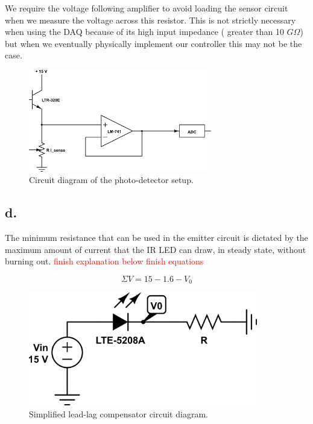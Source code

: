 \documentclass{article}
\newcommand{\xxx}[1]{\textcolor{red}{#1}}
\theoremstyle{plain}
\theoremstyle{definition}
\theoremstyle{remark}
\begin{document}
We require the voltage following amplifier to avoid loading the sensor circuit when we measure the voltage across this resistor.  This is not strictly necessary when using the DAQ because of its high input impedance ( greater than 10 $G\Omega$) but when we eventually physically implement our controller this may not be the case.  


\begin{figure}[h]
\begin{center}
\includegraphics[width=8cm]{lab2_sensorckt.png}
\end{center}
\caption{Circuit diagram of the photo-detector setup.}
\label{q1_c}
\end{figure}


\subsection*{d.}
The minimum resistance that can be used in the emitter circuit is dictated by the maximum amount of current that the IR LED can draw, in steady state, without burning out.  \xxx{finish explanation below}
\xxx{finish equations}

$$ \Sigma{V} = 15 - 1.6 - V_0 $$



\begin{figure}[h]
\begin{center}
\includegraphics[width=10cm]{lab2_emitter.png}
\end{center}
\caption{Simplified lead-lag compensator circuit diagram.}
\label{q1_b}
\end{figure}
\end{document}
